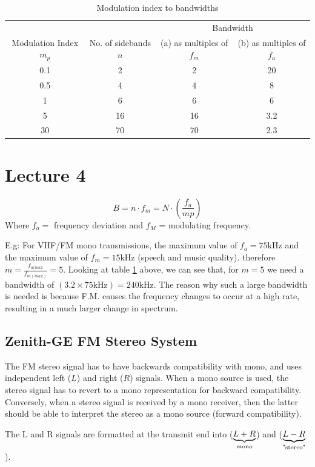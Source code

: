 \documentclass[11pt]{article} %
\begin{document}
\begin{table}[h]
    \begin{tabular}{cccc}
        \hline
 & & \multicolumn{2}{c}{Bandwidth}  \\
Modulation Index $m_p$ & No. of sidebands $n$ &  (a) as multiples of $f_m$ & (b) as multiples of $f_a$ \\ \hline
	0.1 &  2 & 2 & 20 \\
	0.5 & 4 & 4 & 8 \\
	1 & 6 & 6 & 6 \\
	5 & 16 & 16 & 3.2 \\
	30 & 70 & 70 &2.3 \\
    \end{tabular}
	\caption{Modulation index to bandwidths}
	\label{tab:modind}
\end{table}

\section{Lecture 4}
\begin{equation}
B = n\cdot f_m = N\cdot\left(\frac{f_a}{mp}\right)
\end{equation}
Where $f_a=$ frequency deviation and $f_M$ = modulating frequency.

E.g: For VHF/FM mono transmissions, the maximum value of $f_a=75\mbox{kHz}$ and the maximum value of $f_m=15\mbox{kHz}$ (speech and music quality).
therefore $m = \frac{f_{a(max}}{f_{m(max)}} = 5$. Looking at table \ref{tab:modind} above, we can see that, for $m=5$ we need a bandwidth of $(3.2\times 75\mbox{kHz})=240\mbox{kHz}$. The reason why such a large bandwidth is needed is because F.M. causes the frequency changes to occur at a high rate, resulting in a much larger change in spectrum.

\subsection{Zenith-GE FM Stereo System}
The FM stereo signal has to have backwards compatibility with mono, and uses independent left ($L$) and right ($R$) signals. When a mono source is used, the stereo signal has to revert to a mono representation for backward compatibility. Conversely, when a stereo signal is received by a mono receiver, then the latter should be able to interpret the stereo as a mono source (forward compatibility).

The L and R signals are formatted at the transmit end into ($\underbrace{L+R}_{\mbox{\scriptsize mono}}$) and ($\underbrace{L-R}_{\mbox{\scriptsize "stereo"}}$).
\end{document}
